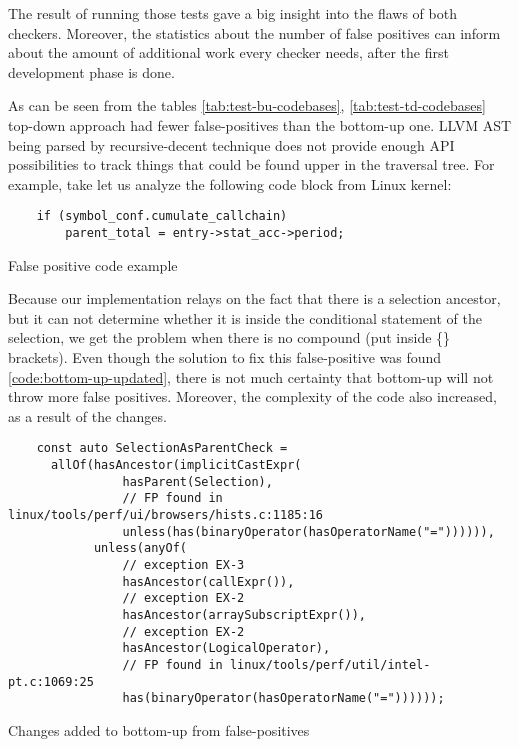 The result of running those tests gave a big insight into the flaws of both checkers. Moreover, the statistics about the number of false positives can inform about the amount of additional work every checker needs, after the first development phase is done. 


As can be seen from the tables \ref{tab:test-bu-codebases}, \ref{tab:test-td-codebases} top-down approach had fewer false-positives than the bottom-up one. LLVM AST being parsed by recursive-decent technique does not provide enough API possibilities to track things that could be found upper in the traversal tree. For example, take let us analyze the following code block from Linux kernel:

\begin{listing}[h]
\begin{verbatim}
    if (symbol_conf.cumulate_callchain)
		parent_total = entry->stat_acc->period;
\end{verbatim}
\caption{False positive code example}
\label{code:bottom-up-fp-no-compound}
\end{listing}

Because our implementation relays on the fact that there is a selection ancestor, but it can not determine whether it is inside the conditional statement of the selection, we get the problem when there is no compound (put inside \{\} brackets). Even though the solution to fix this false-positive was found \ref{code:bottom-up-updated}, there is not much certainty that bottom-up will not throw more false positives. Moreover, the complexity of the code also increased, as a result of the changes.

\begin{listing}[H]
\begin{verbatim}
    const auto SelectionAsParentCheck =
      allOf(hasAncestor(implicitCastExpr(
                hasParent(Selection),
                // FP found in linux/tools/perf/ui/browsers/hists.c:1185:16
                unless(has(binaryOperator(hasOperatorName("=")))))),
            unless(anyOf(
                // exception EX-3
                hasAncestor(callExpr()),
                // exception EX-2
                hasAncestor(arraySubscriptExpr()),
                // exception EX-2
                hasAncestor(LogicalOperator),
                // FP found in linux/tools/perf/util/intel-pt.c:1069:25
                has(binaryOperator(hasOperatorName("="))))));
\end{verbatim}
\caption{Changes added to bottom-up from false-positives}
\label{code:bottom-up-updated}
\end{listing}

